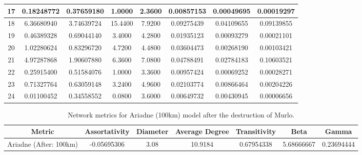 \documentclass[12pt,a4paper]{thesis}
\begin{document}
\begin{table}[H]
\begin{tabular}{|c|c|c|c|c|c|c|c|}
\hline	17	&	0.18248772	&	0.37659180	&	1.0000	&	2.3600	&	0.00857153	&	0.00049695	&	0.00019297	\\
\hline	18	&	6.36680940	&	3.74639724	&	15.4400	&	7.9200	&	0.09275439	&	0.04109655	&	0.09139855	\\
\hline	19	&	0.46389328	&	0.69044140	&	3.4000	&	4.2800	&	0.01935123	&	0.00093279	&	0.00021101	\\
\hline	20	&	1.02280624	&	0.83296720	&	4.7200	&	4.4800	&	0.03604473	&	0.00268190	&	0.00103421	\\
\hline	21	&	4.97287868	&	1.90607880	&	6.3600	&	7.0800	&	0.04788491	&	0.02784183	&	0.10603521	\\
\hline	22	&	0.25915400	&	0.51584076	&	1.0000	&	3.3600	&	0.00957424	&	0.00069252	&	0.00028271	\\
\hline	23	&	0.71327764	&	0.63059148	&	3.2400	&	4.9600	&	0.02103774	&	0.00866464	&	0.00204226	\\
\hline	24	&	0.01100452	&	0.34558552	&	0.0800	&	3.6000	&	0.00649732	&	0.00430945	&	0.00006656	\\
\hline 
\end{tabular} 
\label{tab:ariadneNodeAfter60}
\end{table}


\begin{table}[H]
\centering
\caption{Network metrics for Ariadne (100km) model after the destruction of Murlo.}
\tiny
\begin{tabular}{|c|c|c|c|c|c|c|}
\hline Metric & Assortativity & Diameter & Average Degree & Transitivity & Beta & Gamma \\ 
\hline Ariadne (After: 100km) & -0.05695306	& 3.08 & 10.9184 & 0.67954338 & 5.68666667	& 0.23694444
 \\ 
\hline 
\end{tabular} 
\label{tab:ariadneNetAfter100}
\end{table}
\end{document}
